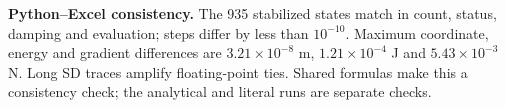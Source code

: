 \small\noindent\textbf{Python--Excel consistency.} The 935 stabilized states match in count, status, damping and evaluation; steps differ by less than $10^{-10}$. Maximum coordinate, energy and gradient differences are $3.21\times10^{-8}$ m, $1.21\times10^{-4}$ J and $5.43\times10^{-3}$ N. Long SD traces amplify floating-point ties. Shared formulas make this a consistency check; the analytical and literal runs are separate checks.\normalsize
